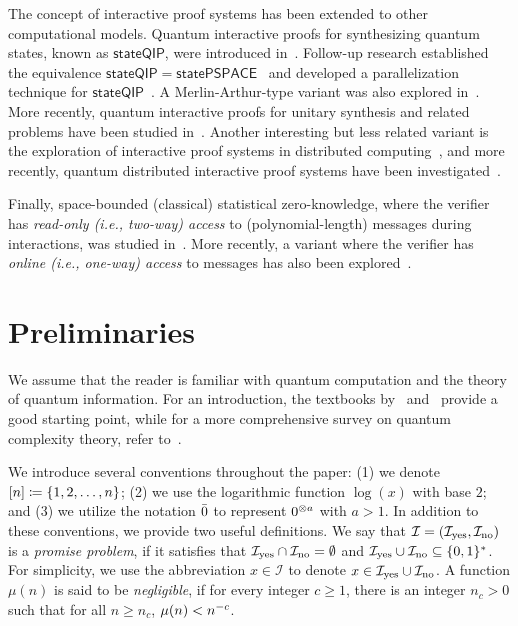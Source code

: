 \documentclass[11pt, a4paper]{article}
\numberwithin{equation}{section}
\numberwithin{figure}{section}
\DeclarePairedDelimiter\rbra{\lparen}{\rparen}
\DeclarePairedDelimiter\sbra{\lbrack}{\rbrack}
\DeclarePairedDelimiter\cbra{\{}{\}}
\let\ket\relax\DeclarePairedDelimiter\ket{\lvert}{\rangle}
\newcommand{\yes}{{\rm yes}}
\newcommand{\no}{{\rm no}}
\newcommand{\binset}{\{0,1\}}
\newcommand{\calI}{\mathcal{I}}
\begin{document}
The concept of interactive proof systems has been extended to other computational models. Quantum interactive proofs for synthesizing quantum states, known as $\mathsf{stateQIP}$, were introduced in~\cite{RY22}. Follow-up research established the equivalence $\mathsf{stateQIP} = \mathsf{statePSPACE}$~\cite{MY23} and developed a parallelization technique for $\mathsf{stateQIP}$~\cite{INNSY22,Rosenthal23}. A Merlin-Arthur-type variant was also explored in~\cite{DLGLM23,DLG24}. More recently, quantum interactive proofs for unitary synthesis and related problems have been studied in~\cite{BEMPQY23,LMW24}.
Another interesting but less related variant is the exploration of interactive proof systems in distributed computing~\cite{KOS18,NPY20}, and more recently, quantum distributed interactive proof systems have been investigated~\cite{FPLGN21,LGMN23,HKN24}.

Finally, space-bounded (classical) statistical zero-knowledge, where the verifier has \textit{read-only (i.e., two-way) access} to (polynomial-length) messages during interactions, was studied in~\cite{DGRV11,AHT23,AGMTW22}. More recently, a variant where the verifier has \textit{online (i.e., one-way) access} to messages has also been explored~\cite{CDGH23}. 

\section{Preliminaries}

We assume that the reader is familiar with quantum computation and the theory of quantum information. For an introduction, the textbooks by~\cite{NC10} and~\cite{deWolf19} provide a good starting point, while for a more comprehensive survey on quantum complexity theory, refer to~\cite{Watrous08}. 

We introduce several conventions throughout the paper: (1) we denote $\sbra{n} \coloneqq \cbra{1, 2, \dots, n}$; (2) we use the logarithmic function $\log(x)$ with base $2$; and (3) we utilize the notation $\ket{\bar{0}}$ to represent $\ket{0}^{\otimes a}$ with $a>1$.
In addition to these conventions, we provide two useful definitions. 
We say that $\calI = (\calI_{\yes}, \calI_{\no})$ is a \textit{promise problem}, if it satisfies that $\calI_{\yes} \cap \calI_{\no} =\emptyset$ and $\calI_{\yes} \cup \calI_{\no} \subseteq \binset^*$. For simplicity, we use the abbreviation $x\in\calI$ to denote $x\in \calI_{\yes} \cup \calI_{\no}$.
A function $\mu(n)$ is said to be \textit{negligible}, if for every integer $c \geq 1$, there is an integer $n_c > 0$ such that for all $n \geq n_c$, $\mu\rbra{n} < n^{-c}$. 
\end{document}
